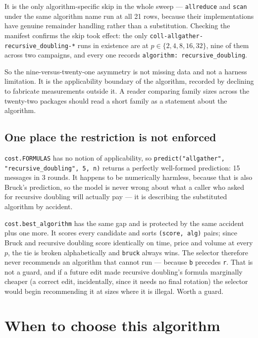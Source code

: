 \documentclass[11pt]{article}
\begin{document}
\noindent
It is the only algorithm-specific skip in the whole sweep --- \texttt{allreduce} and
\texttt{scan} under the same algorithm name run at all 21 rows, because their implementations
have genuine remainder handling rather than a substitution. Checking the manifest confirms the
skip took effect: the only \texttt{coll-allgather-recursive\_doubling-*} runs in existence are at
$p \in \{2, 4, 8, 16, 32\}$, nine of them across two campaigns, and every one records
\texttt{algorithm: recursive\_doubling}.

So the nine-versus-twenty-one asymmetry is not missing data and not a harness limitation. It is
the applicability boundary of the algorithm, recorded by declining to fabricate measurements
outside it. A reader comparing family sizes across the twenty-two packages should read a short
family as a statement about the algorithm.

\subsection{One place the restriction is not enforced}

\texttt{cost.FORMULAS} has no notion of applicability, so
\texttt{predict("allgather", "recursive\_doubling", 5, n)} returns a perfectly well-formed
prediction: 15 messages in 3 rounds. It happens to be numerically harmless, because that is also
Bruck's prediction, so the model is never wrong about what a caller who asked for recursive
doubling will actually pay --- it is describing the substituted algorithm by accident.

\texttt{cost.best\_algorithm} has the same gap and is protected by the same accident plus one
more. It scores every candidate and sorts \texttt{(score, alg)} pairs; since Bruck and recursive
doubling score identically on time, price and volume at every $p$, the tie is broken
alphabetically and \texttt{bruck} always wins. The selector therefore never recommends an
algorithm that cannot run --- because \texttt{b} precedes \texttt{r}. That is not a guard, and if
a future edit made recursive doubling's formula marginally cheaper (a correct edit, incidentally,
since it needs no final rotation) the selector would begin recommending it at sizes where it is
illegal. Worth a guard.

\section{When to choose this algorithm}
\end{document}
